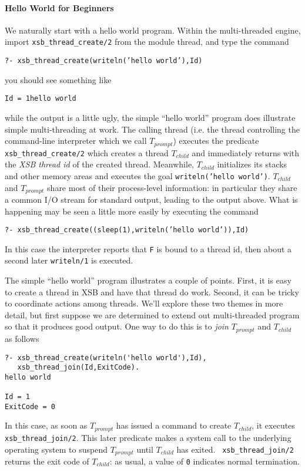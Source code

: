 \paragraph{Hello World for Beginners}
%
We naturally start with a hello world program.  Within the
multi-threaded engine, import {\tt xsb\_thread\_create/2} from the
module thread, and type the command 
\begin{center} 
{\tt ?- xsb\_thread\_create(writeln('hello world'),Id)} 
\end{center} 
you should see something like 
\begin{center} 
{\tt Id = 1hello world} 
\end{center} 
%
while the output is a little ugly, the simple ``hello world'' program
does illustrate simple multi-threading at work.  The calling thread
(i.e. the thread controlling the command-line interpreter which we
call $T_{prompt}$) executes the predicate {\tt xsb\_thread\_create/2}
which creates a thread $T_{child}$ and immediately returns with the
{\em XSB thread id} of the created thread.  Meanwhile, $T_{child}$
initializes its stacks and other memory areas and executes the goal
{\tt writeln('hello world')}.  $T_{child}$ and $T_{prompt}$ share most
of their process-level information: in particular they share a common
I/O stream for standard output, leading to the output above.  What is
happening may be seen a little more easily by executing the command
%
\begin{center} 
{\tt ?- xsb\_thread\_create((sleep(1),writeln('hello world')),Id)} 
\end{center} 
%
In this case the interpreter reports that {\tt F} is bound to a thread
id, then about a second later {\tt writeln/1} is executed.  

The simple ``hello world'' program illustrates a couple of points.
First, it is easy to create a thread in XSB and have that thread do
work.  Second, it can be tricky to coordinate actions among threads.
We'll explore these two themes in more detail, but first suppose we
are determined to extend out multi-threaded program so that it
produces good output.  One way to do this is to {\em join}
$T_{prompt}$ and $T_{child}$ as follows 
%
\begin{verbatim}
?- xsb_thread_create(writeln('hello world'),Id),
   xsb_thread_join(Id,ExitCode).
hello world

Id = 1
ExitCode = 0
\end{verbatim}
%
In this case, as soon as $T_{prompt}$ has issued a command to create
$T_{child}$, it executes {\tt xsb\_thread\_join/2}.  This later
predicate makes a system call to the underlying operating system to
suspend $T_{prompt}$ until $T_{child}$ has exited.  {\tt
  xsb\_thread\_join/2} returns the exit code of $T_{child}$: as usual,
a value of {\tt 0} indicates normal termination.  

